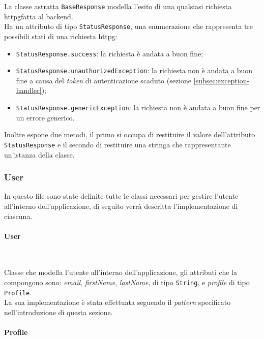 La classe astratta \lstinline{BaseResponse} modella l'esito di una qualsiasi richiesta \gls{httpg}\glsoccur fatta al \gls{backend}\glsoccur. \\
Ha un attributo di tipo \lstinline{StatusResponse}, una enumerazione che rappresenta tre possibili stati di una richiesta \gls{httpg}\glsoccur:
\begin{itemize}
    \item \lstinline{StatusResponse.success}: la richiesta è andata a buon fine;
    \item \lstinline{StatusResponse.unauthorizedException}: la richiesta non è andata a buon fine a causa del \emph{token} di autenticazione scaduto (sezione \ref{subsec:exception-handler});
    \item \lstinline{StatusResponse.genericException}: la richiesta non è andata a buon fine per un errore generico.
\end{itemize}
Inoltre espone due metodi, il primo si occupa di restituire il valore dell'attributo \lstinline{StatusResponse} e il secondo di restituire una stringa che rappresentante un'istanza della classe.

\subsubsection*{User}
\label{subsubsec:user}

In questo file sono state definite tutte le classi necessari per gestire l'utente all'interno dell'applicazione, di seguito verrà descritta l'implementazione di ciascuna.

\paragraph*{User} ~ \\
\label{par:user}

\noindent Classe che modella l'utente all'interno dell'applicazione, gli attributi che la compongono sono: \emph{email}, \emph{firstName}, \emph{lastName}, di tipo \lstinline{String}, e \emph{profile} di tipo \lstinline{Profile}. \\
La sua implementazione è stata effettuata seguendo il \emph{pattern} specificato nell'introduzione di questa sezione.

\paragraph*{Profile} ~ \\
\label{par:profile}

